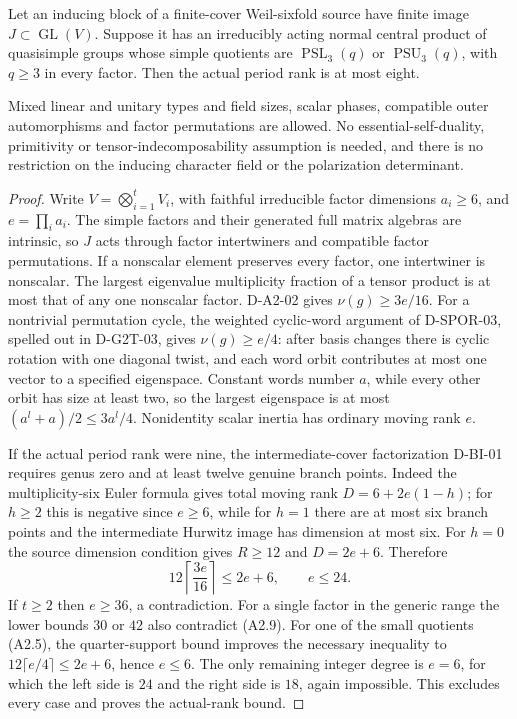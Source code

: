 \begin{theorem}[D-A2-03]
\label{D-A2-03}
Let an inducing block of a finite-cover Weil-sixfold source have
finite image $J\subset\operatorname{GL}(V)$.  Suppose it has an
irreducibly acting normal central product of quasisimple groups
whose simple quotients are $\operatorname{PSL}_3(q)$ or
$\operatorname{PSU}_3(q)$, with $q\ge3$ in every factor.
Then the actual period rank is at most eight.

Mixed linear and unitary types and field sizes, scalar phases,
compatible outer automorphisms and factor permutations are allowed.
No essential-self-duality, primitivity or tensor-indecomposability
assumption is needed, and there is no restriction on the inducing
character field or the polarization determinant.
\end{theorem}

\begin{proof}
Write $V=\bigotimes_{i=1}^t V_i$, with faithful irreducible
factor dimensions $a_i\ge6$, and $e=\prod_i a_i$.
The simple factors and their generated full matrix algebras are
intrinsic, so $J$ acts through factor intertwiners and compatible
factor permutations.  If a nonscalar element preserves every
factor, one intertwiner is nonscalar.  The largest eigenvalue
multiplicity fraction of a tensor product is at most that of
any one nonscalar factor.  D-A2-02 gives $\nu(g)\ge3e/16$.
For a nontrivial permutation cycle, the weighted cyclic-word
argument of D-SPOR-03, spelled out in D-G2T-03, gives
$\nu(g)\ge e/4$: after basis changes there is cyclic rotation
with one diagonal twist, and each word orbit contributes at
most one vector to a specified eigenspace.  Constant words
number $a$, while every other orbit has size at least two,
so the largest eigenspace is at most $(a^l+a)/2\le3a^l/4$.
Nonidentity scalar inertia has ordinary moving rank $e$.

If the actual period rank were nine, the intermediate-cover
factorization D-BI-01 requires genus zero and at least twelve
genuine branch points.  Indeed the multiplicity-six Euler formula
gives total moving rank $D=6+2e(1-h)$; for $h\ge2$ this is
negative since $e\ge6$, while for $h=1$ there are at most six
branch points and the intermediate Hurwitz image has dimension
at most six.  For $h=0$ the source dimension condition gives
$R\ge12$ and $D=2e+6$.  Therefore
\[
       12\left\lceil\frac{3e}{16}\right\rceil\le2e+6,
                     \qquad e\le24.                     \tag{A2.9}
\]
If $t\ge2$ then $e\ge36$, a contradiction.  For a single
factor in the generic range the lower bounds $30$ or $42$
also contradict (A2.9).  For one of the small quotients (A2.5),
the quarter-support bound improves the necessary inequality to
$12\lceil e/4\rceil\le2e+6$, hence $e\le6$.
The only remaining integer degree is $e=6$, for which the
left side is $24$ and the right side is $18$, again impossible.
This excludes every case and proves the actual-rank bound.
\end{proof}

